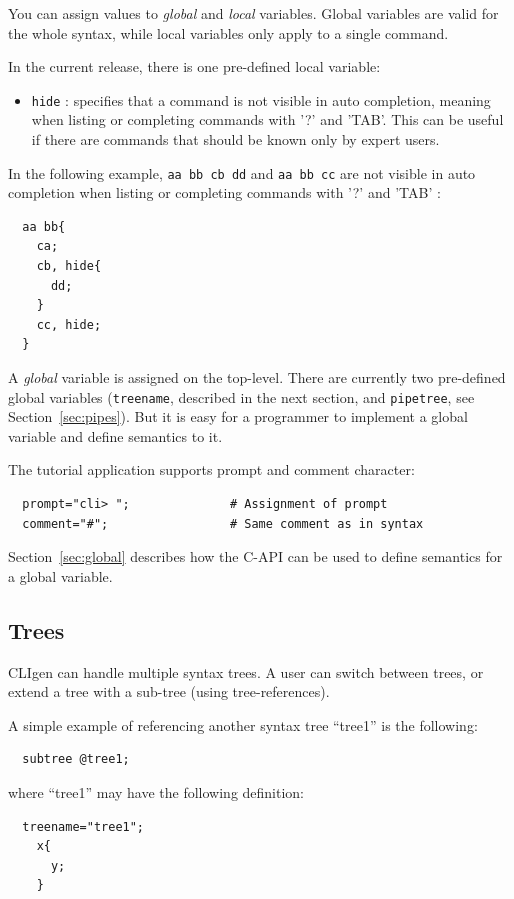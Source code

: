 \documentclass[a4paper, 10pt] {article}
\begin{document}
You can assign values to \emph{global} and \emph{local}
variables. Global variables are valid for the whole syntax, while
local variables only apply to a single command.

In the current release, there is one pre-defined local variable:
\begin{itemize}
\item
{\tt hide} : specifies that a command is not visible in auto completion, meaning when listing or completing commands with '?' and 'TAB'. This can be useful if there are commands that should be known only by expert users.
\end{itemize}

In the following example, {\tt aa bb cb dd} and {\tt aa bb cc} are not visible in auto completion
when listing or completing commands with '?' and 'TAB' :
\begin{verbatim}
  aa bb{
    ca;
    cb, hide{
      dd;
    }
    cc, hide;
  }
\end{verbatim}

A {\em global} variable is assigned on the top-level.  There are
currently two pre-defined global variables ({\tt treename}, described
in the next section, and {\tt pipetree}, see
Section~\ref{sec:pipes}).  But it is easy for a programmer to
implement a global variable and define semantics to it. 

The tutorial application supports prompt and comment character:
\begin{verbatim}
  prompt="cli> ";              # Assignment of prompt
  comment="#";                 # Same comment as in syntax
\end{verbatim}
Section~\ref{sec:global} describes how the C-API can be used to define
semantics for a global variable.

\subsection{Trees}

CLIgen can handle multiple syntax trees. A user can switch between
trees, or extend a tree with a sub-tree (using tree-references).

A simple example of referencing another syntax tree ``tree1'' is the following:
\begin{verbatim}
  subtree @tree1;
\end{verbatim}

where ``tree1'' may have the following definition:
\begin{verbatim}
  treename="tree1";
    x{
      y;
    }
\end{verbatim}
\end{document}
